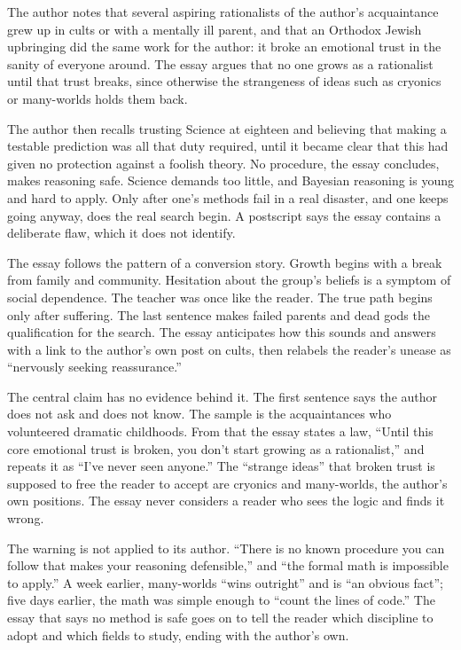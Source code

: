 \begin{afterword}
\summaryhead

The author notes that several aspiring rationalists of the author's acquaintance grew up in cults or with a mentally ill parent, and that an Orthodox Jewish upbringing did the same work for the author: it broke an emotional trust in the sanity of everyone around. The essay argues that no one grows as a rationalist until that trust breaks, since otherwise the strangeness of ideas such as cryonics or many-worlds holds them back.

The author then recalls trusting Science at eighteen and believing that making a testable prediction was all that duty required, until it became clear that this had given no protection against a foolish theory. No procedure, the essay concludes, makes reasoning safe. Science demands too little, and Bayesian reasoning is young and hard to apply. Only after one's methods fail in a real disaster, and one keeps going anyway, does the real search begin. A postscript says the essay contains a deliberate flaw, which it does not identify.

\responsehead

The essay follows the pattern of a conversion story. Growth begins with a break from family and community. Hesitation about the group's beliefs is a symptom of social dependence. The teacher was once like the reader. The true path begins only after suffering. The last sentence makes failed parents and dead gods the qualification for the search. The essay anticipates how this sounds and answers with a link to the author's own post on cults, then relabels the reader's unease as ``nervously seeking reassurance.''

The central claim has no evidence behind it. The first sentence says the author does not ask and does not know. The sample is the acquaintances who volunteered dramatic childhoods. From that the essay states a law, ``Until this core emotional trust is broken, you don't start growing as a rationalist,'' and repeats it as ``I've never seen anyone.'' The ``strange ideas'' that broken trust is supposed to free the reader to accept are cryonics and many-worlds, the author's own positions. The essay never considers a reader who sees the logic and finds it wrong.

The warning is not applied to its author. ``There is no known procedure you can follow that makes your reasoning defensible,'' and ``the formal math is impossible to apply.'' A week earlier, many-worlds ``wins outright'' and is ``an obvious fact''; five days earlier, the math was simple enough to ``count the lines of code.'' The essay that says no method is safe goes on to tell the reader which discipline to adopt and which fields to study, ending with the author's own.


\end{afterword}
